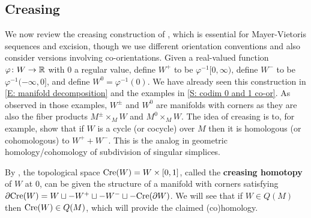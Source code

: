 \begin{comment}
	For the third product, we have by Joyce's convention that \red{I'm not getting a simple description of this because of Joyce's desription.
		Note that it requires using a specific identification of $TV \oplus TW$ with $TP \oplus TM$.
		I compute that even if we use identify $TM = \nu W \oplus TP \oplus \nu V$, $TV = \nu W \oplus TP$, and $TW = TP \oplus \nu V \oplus TP$ consistently, there's a sign of $(-1)^{m-w}$ from the determinant of Joyce's isomorphism, and then he enforces another factor of $(-1)^{mw}$ by hand.
		Yuck.
		And this is before comparing the actual orientations of things - yuck.
		We'll have to think some more about this.
	}.
\end{comment}

\subsection{Creasing}\label{S: creasing}

We now review the creasing construction of \cite[Section 2.4]{Lipy14}, which is essential for Mayer-Vietoris sequences and excision, though we use different orientation conventions and also consider versions involving co-orientations.
Given a real-valued function $\varphi \colon W \to \mathbb{R}$ with $0$ a regular value,
define $W^+$ to be $\varphi^{-1} [0, \infty)$, define $W^-$ to be $\varphi^{-1} (-\infty, 0]$, and define $W^0 = \varphi^{-1}(0)$.
We have already seen this construction in \cref{E: manifold decomposition} and the examples in \cref{S: codim 0 and 1 co-or}.
As observed in those examples, $W^\pm$ and $W^0$
are manifolds with corners as they are also the fiber products $M^\pm \times_M W$ and $M^0 \times_M W$.
The idea of creasing is to, for example, show that if $W$ is a cycle (or cocycle) over $M$ then it is homologous (or cohomologous) to $W^++W^-$.
This is the analog in geometric homology/cohomology of subdivision of singular simplices.

By \cite[Lemma~9]{Lipy14}, the topological space $\mathrm{Cre}(W) = W \times [0,1]$, called the \textbf{creasing homotopy} of $W$ at $0$, can be given the structure of a manifold with corners satisfying $\partial \mathrm{Cre}(W) = W \sqcup -W^+ \sqcup -W^- \sqcup - \mathrm{Cre}(\partial W)$.
We will see that if $W \in Q(M)$ then $\mathrm{Cre}(W) \in Q(M)$, which will provide the claimed (co)homology.

